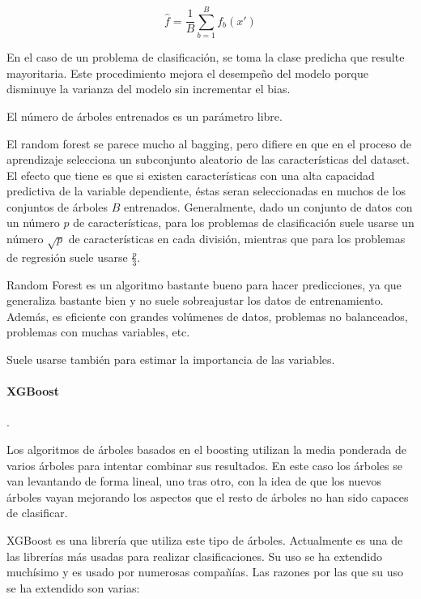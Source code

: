 \documentclass[11pt,a4paper,spanish]{article} %
\begin{document}
$$\hat{f} = \frac{1}{B} \sum_{b=1}^B f_b(x')$$

En el caso de un problema de clasificación, se toma la clase predicha que resulte mayoritaria. Este procedimiento mejora el desempeño del modelo porque disminuye la varianza del modelo sin incrementar el bias.

El número de árboles entrenados es un parámetro libre. 

El random forest se parece mucho al bagging, pero difiere en que en el proceso de aprendizaje selecciona un subconjunto aleatorio de las características del dataset. El efecto que tiene es que si existen características con una alta capacidad predictiva de la variable dependiente, éstas seran seleccionadas en muchos de los conjuntos de árboles $B$ entrenados. Generalmente, dado un conjunto de datos con un número $p$ de características, para los problemas de clasificación suele usarse un número $\sqrt{p}$ de características en cada división, mientras que para los problemas de regresión suele usarse $\frac{p}{3}$.

Random Forest es un algoritmo bastante bueno para hacer predicciones, ya que generaliza bastante bien y no suele sobreajustar los datos de entrenamiento. Además, es eficiente con grandes volúmenes de datos, problemas no balanceados, problemas con muchas variables, etc. 

Suele usarse también para estimar la importancia de las variables. 

\paragraph{XGBoost}  .

Los algoritmos de árboles basados en el boosting utilizan la media ponderada de varios árboles para intentar combinar sus resultados. En este caso los árboles se van levantando de forma lineal, uno tras otro, con la idea de que los nuevos árboles vayan mejorando los aspectos que el resto de árboles no han sido capaces de clasificar.

XGBoost es una librería que utiliza este tipo de árboles. Actualmente es una de las librerías más usadas para realizar clasificaciones. Su uso se ha extendido muchísimo y es usado por numerosas compañías. Las razones por las que su uso se ha extendido son varias:
\end{document}

